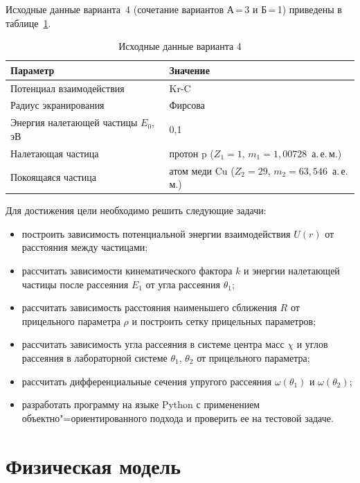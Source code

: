 \documentclass[a4paper,14pt]{extarticle}
\begin{document}
Исходные данные варианта~4 (сочетание вариантов А\,=\,3 и Б\,=\,1)
приведены в таблице~\ref{tab:variant}.

\begin{table}[H]
  \caption{Исходные данные варианта 4}
  \label{tab:variant}
  \begin{tabular}{|p{8cm}|p{7.2cm}|}
    \hline
    Параметр & Значение \\ \hline
    Потенциал взаимодействия & Kr-C \\ \hline
    Радиус экранирования & Фирсова \\ \hline
    Энергия налетающей частицы $E_0$, эВ & 0,1 \\ \hline
    Налетающая частица & протон p ($Z_1 = 1$, $m_1 = 1{,}00728$~а.\,е.\,м.) \\ \hline
    Покоящаяся частица & атом меди Cu ($Z_2 = 29$, $m_2 = 63{,}546$~а.\,е.\,м.) \\ \hline
  \end{tabular}
\end{table}

Для достижения цели необходимо решить следующие задачи:
\begin{itemize}
  \item построить зависимость потенциальной энергии взаимодействия $U(r)$
        от расстояния между частицами;
  \item рассчитать зависимости кинематического фактора $k$ и энергии
        налетающей частицы после рассеяния $E_1$ от угла рассеяния $\theta_1$;
  \item рассчитать зависимость расстояния наименьшего сближения $R$ от
        прицельного параметра $\rho$ и построить сетку прицельных параметров;
  \item рассчитать зависимость угла рассеяния в системе центра масс $\chi$
        и углов рассеяния в лабораторной системе $\theta_1$, $\theta_2$
        от прицельного параметра;
  \item рассчитать дифференциальные сечения упругого рассеяния
        $\omega(\theta_1)$ и $\omega(\theta_2)$;
  \item разработать программу на языке Python с применением
        объектно"=ориентированного подхода и проверить ее на тестовой задаче.
\end{itemize}

\section{Физическая модель}
\end{document}
